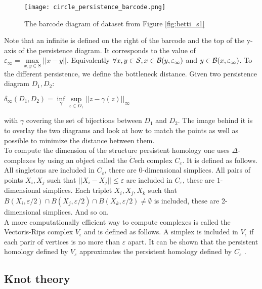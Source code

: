 \documentclass[12pt, a4paper]{article}
\begin{document}
\begin{figure}[p]
             \centering
            \texttt{[image: circle\_persistence\_barcode.png]}
        \caption{The barcode diagram of dataset from Figure \ref{fig:betti_s1}}
        \label{fig:persistence_barcode}
\end{figure}

Note that an infinite is defined on the right of the barcode and the top of the y-axis of the persistence diagram. It corresponds to the value of $\varepsilon_\infty = \max\limits_{x,y \in S} ||x-y||$. Equivalently $\forall x,y \in \mathcal{S}, x \in \mathcal{B}(y ,\varepsilon_\infty)$ and $y \in \mathcal{B}(x, \varepsilon_\infty)$. To the different persistence, we define the bottleneck distance. Given two persistence diagram $D_1, D_2$:

\begin{center}
  $\delta_\infty(D_1, D_2) = \inf\limits_{\gamma} \sup\limits_{z \in D_1} ||z - \gamma(z)||_\infty$
\end{center}

with $\gamma$ covering the set of bijections between $D_1$ and $D_2$. The image behind it is to overlay the two diagrams and look at how to match the points as well as possible to minimize the distance between them.\\

To compute the dimension of the structure persistent homology one uses $\Delta$-complexes by using an object called the $\check{C}$ech complex $C_\varepsilon$. It is defined as follows. All singletons are included in $C_\varepsilon$, there are $0$-dimensional simplices. All pairs of points $X_i, X_j$ such that $||X_i - X_j|| \le \varepsilon$ are included in $C_\varepsilon$, these are $1$-dimensional simplices. Each triplet $X_i, X_j, X_k$ such that $B(X_i, \varepsilon/2) \cap B(X_j, \varepsilon/2) \cap B(X_k, \varepsilon/2) \neq \emptyset$ is included, these are 2-dimensional simplices. And so on.\\ 

A more computationally efficient way to compute complexes is called the Vectoris-Rips complex $V_\epsilon$ and is defined as follows. A simplex is included in $V_\epsilon$ if each parir of vertices is no more than $\varepsilon$ apart. It can be shown that the persistent homology defined by $V_\varepsilon$ approximates the persistent homology defined by $C_\varepsilon$ .

\subsection{Knot theory}
\end{document}
